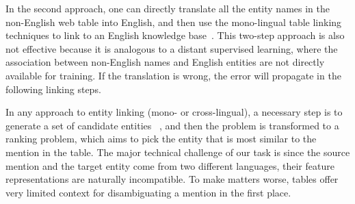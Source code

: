 In the second approach, one can directly translate all the entity names in
the non-English web table into English,
and then use the mono-lingual table linking techniques to link to 
an English knowledge base~\cite{mcnamee2011cross}.
This two-step approach is also not effective because
it is analogous to a distant supervised learning,
where the association between non-English names and English entities are not directly available for training.
If the translation is wrong, the error will propagate in the following linking steps.





In any approach to entity linking (mono- or cross-lingual), 
a necessary step is to generate a set of candidate entities
~\cite{tsai2016cross,mcnamee2011cross,bhagavatula2015tabel,wu2016entity},
and then the problem is transformed to a ranking problem, which aims to pick
the entity that is most similar to the mention in the table. 
The major technical challenge of our task is since the source mention
and the target entity come from two different languages,
their feature representations are naturally incompatible. 
To make matters worse, tables offer very limited context for disambiguating
a mention in the first place.

